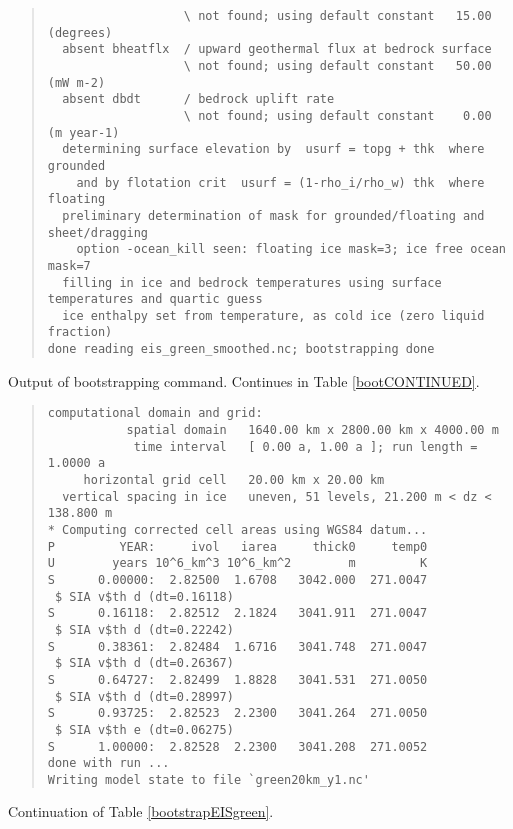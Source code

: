 \begin{table}
\begin{quote}
\begin{verbatim}
                   \ not found; using default constant   15.00 (degrees)
  absent bheatflx  / upward geothermal flux at bedrock surface                   
                   \ not found; using default constant   50.00 (mW m-2)
  absent dbdt      / bedrock uplift rate                                         
                   \ not found; using default constant    0.00 (m year-1)
  determining surface elevation by  usurf = topg + thk  where grounded
    and by flotation crit  usurf = (1-rho_i/rho_w) thk  where floating
  preliminary determination of mask for grounded/floating and sheet/dragging
    option -ocean_kill seen: floating ice mask=3; ice free ocean mask=7
  filling in ice and bedrock temperatures using surface temperatures and quartic guess
  ice enthalpy set from temperature, as cold ice (zero liquid fraction)
done reading eis_green_smoothed.nc; bootstrapping done
\end{verbatim}
\end{quote}
\normalsize
\bigskip
\caption{Output of bootstrapping command.  Continues in Table \ref{bootCONTINUED}.}
\label{bootstrapEISgreen}
\end{table}

\begin{table}
\centering
\scriptsize
\begin{quote}
\begin{verbatim}
computational domain and grid:
           spatial domain   1640.00 km x 2800.00 km x 4000.00 m
            time interval   [ 0.00 a, 1.00 a ]; run length = 1.0000 a
     horizontal grid cell   20.00 km x 20.00 km
  vertical spacing in ice   uneven, 51 levels, 21.200 m < dz < 138.800 m
* Computing corrected cell areas using WGS84 datum...
P         YEAR:     ivol   iarea     thick0     temp0
U        years 10^6_km^3 10^6_km^2        m         K
S      0.00000:  2.82500  1.6708   3042.000  271.0047
 $ SIA v$th d (dt=0.16118)
S      0.16118:  2.82512  2.1824   3041.911  271.0047
 $ SIA v$th d (dt=0.22242)
S      0.38361:  2.82484  1.6716   3041.748  271.0047
 $ SIA v$th d (dt=0.26367)
S      0.64727:  2.82499  1.8828   3041.531  271.0050
 $ SIA v$th d (dt=0.28997)
S      0.93725:  2.82523  2.2300   3041.264  271.0050
 $ SIA v$th e (dt=0.06275)
S      1.00000:  2.82528  2.2300   3041.208  271.0052
done with run ... 
Writing model state to file `green20km_y1.nc'
\end{verbatim}
\end{quote}
\normalsize
\bigskip

\caption{Continuation of Table \ref{bootstrapEISgreen}.}
\label{bootCONTINUED}
\end{table}

